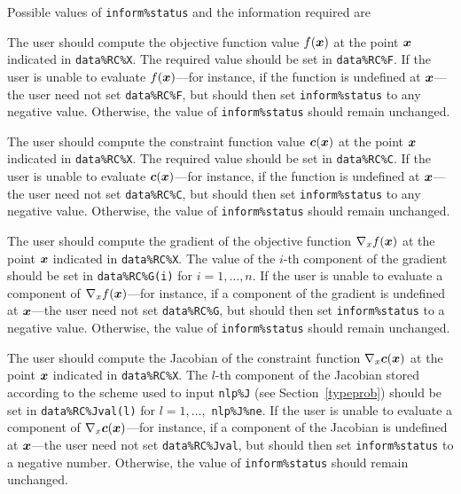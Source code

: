 \documentclass{galahad}
\begin{document}
Possible values of {\tt inform\%status} and the information required are
\begin{description}

 The user should compute the objective function
     value $f({\bm{x}})$ at the point ${\bm{x}}$ indicated in {\tt data\%RC\%X}.
     The required value should be set in {\tt data\%RC\%F}.  If the user is
     unable to evaluate $f({\bm{x}})$---for instance, if the function is
     undefined at ${\bm{x}}$---the user need not set {\tt data\%RC\%F}, but
     should then set {\tt inform\%status} to any negative value.
     Otherwise, the value of {\tt inform\%status} should remain unchanged.

 The user should compute the constraint function
     value ${\bm{c}}({\bm{x}})$ at the point ${\bm{x}}$ indicated in {\tt data\%RC\%X}.
     The required value should be set in {\tt data\%RC\%C}.  If the user is
     unable to evaluate ${\bm{c}}({\bm{x}})$---for instance, if the function is
     undefined at ${\bm{x}}$---the user need not set {\tt data\%RC\%C}, but
     should then set {\tt inform\%status} to any negative value.
     Otherwise, the value of {\tt inform\%status} should remain unchanged.

 The user should compute the gradient 
     of the objective function $\nabla_x f({\bm{x}})$ at the point ${\bm{x}}$ 
     indicated in {\tt data\%RC\%X}.
     The value of the $i$-th component of the gradient should be set 
     in {\tt data\%RC\%G(i)} for $i = 1, \ldots, n$.  If the user is
     unable to evaluate a component of $\nabla_x f({\bm{x}})$---for instance, 
     if a component of the gradient is
     undefined at ${\bm{x}}$---the user need not set {\tt data\%RC\%G}, but
     should then set {\tt inform\%status} to a negative
     value. Otherwise, the value of {\tt inform\%status} should remain
     unchanged.

 The user should compute the Jacobian  
     of the constraint function $\nabla_x {\bm{c}}({\bm{x}})$ at the point ${\bm{x}}$ 
     indicated in {\tt data\%RC\%X}. The $l$-th component of the Jacobian stored according to the
     scheme used to input {\tt nlp\%J} (see Section~\ref{typeprob})
     should be set in {\tt data\%RC\%Jval(l)} 
     for $l = 1, \ldots,$ {\tt  nlp\%J\%ne}.  If the user is
     unable to evaluate a component of $\nabla_x {\bm{c}}({\bm{x}})$---for instance, 
     if a component of the Jacobian is
     undefined at ${\bm{x}}$---the user need not set {\tt data\%RC\%Jval}, but
     should then set {\tt inform\%status} to a negative number.
     Otherwise, the value of {\tt inform\%status} should remain
     unchanged.


\end{description}
\end{document}
